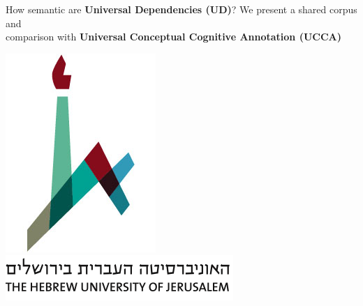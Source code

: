 \documentclass[extrafontsizes,60pt,twocolumn]{memoir}
\begin{document}
\begin{strip}
\begin{center}
\begin{minipage}[b]{.75\linewidth}
    \titlespacing*{\section}{0pt}{8mm}{.5in}
    \begin{adjustbox}{margin=.5in,frame,minipage=\textwidth,center}
      \centering\huge
      How semantic are \textbf{\HUGE \color{red} Universal Dependencies (UD)}?
      \hfill We present a shared corpus and \\
      \hfill comparison with
      \textbf{\HUGE \color{blue} Universal Conceptual Cognitive Annotation (UCCA)}
    \end{adjustbox}
  \end{minipage}
  \hfill
  \begin{minipage}[b]{.09\linewidth}
    \hfill \includegraphics[width=.6\linewidth]{huji_logo.jpg} \\
    \includegraphics[width=\linewidth]{huji_banner.png}
    \vspace{-2.5in}
  \end{minipage}
  \end{center}
\end{strip}

\end{document}
